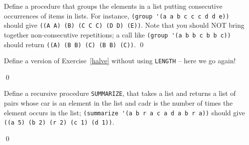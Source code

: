 \documentclass[a4paper,11pt]{article}
\begin{document}
\begin{uexercise}
Define a procedure that groups the elements in a list putting consecutive occurrences of items in lists. For instance, \Verb+(group '(a a b c c c d d e))+ should give \Verb+((A A) (B) (C C C) (D D) (E))+. Note that you should NOT bring together non-consecutive repetitions; a call like  \Verb+(group '(a b b c b b c))+ should return \Verb+((A) (B B) (C) (B B) (C))+.
\qed
\end{uexercise}


\begin{uexercise}
Define a version of Exercise~\ref{halve} without using \Verb+LENGTH+ -- here we go again!

\qed
\end{uexercise}

\begin{uexercise}[*]
Define a recursive procedure \Verb+SUMMARIZE+, that takes a list and returns a list of pairs whose car is an element in the list and cadr is the number of times the element occurs in the list; \Verb+(summarize '(a b r a c a d a b r a))+ should give \Verb+((a 5) (b 2) (r 2) (c 1) (d 1))+.

\qed
\end{uexercise}
\end{document}
